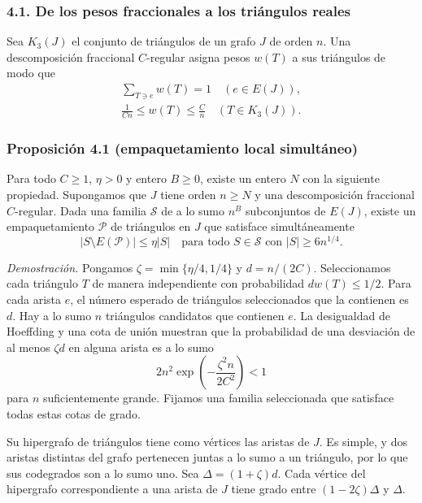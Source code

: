 \documentclass[spanish,11pt,a4paper]{article}
\providecommand{\mathscr}{\mathcal}
\begin{document}
\subsubsection{4.1. De los pesos fraccionales a los triángulos reales}\label{de-los-pesos-fraccionales-a-los-triuxe1ngulos-reales}

Sea \(K_3(J)\) el conjunto de triángulos de un grafo \(J\) de orden \(n\). Una descomposición fraccional \(C\)-regular asigna pesos \(w(T)\) a sus triángulos de modo que \[\begin{gathered}
\sum_{T\ni e}w(T)=1\quad(e\in E(J)),\\
\frac1{Cn}\le w(T)\le\frac Cn\quad(T\in K_3(J)).
\end{gathered}
\tag{4.1}\]

\subsubsection{Proposición 4.1 (empaquetamiento local simultáneo)}\label{proposiciuxf3n-4.1-empaquetamiento-local-simultuxe1neo}

Para todo \(C\ge1\), \(\eta>0\) y entero \(B\ge0\), existe un entero \(N\) con la siguiente propiedad. Supongamos que \(J\) tiene orden \(n\ge N\) y una descomposición fraccional \(C\)-regular. Dada una familia \(\mathscr S\) de a lo sumo \(n^B\) subconjuntos de \(E(J)\), existe un empaquetamiento \(\mathcal P\) de triángulos en \(J\) que satisface simultáneamente \[|S\setminus E(\mathcal P)|\le\eta|S|
\quad\text{para todo }S\in\mathscr S\text{ con }|S|\ge6n^{1/4}.
\tag{4.2}\]

\emph{Demostración.} Pongamos \(\zeta=\min\{\eta/4,1/4\}\) y \(d=n/(2C)\). Seleccionamos cada triángulo \(T\) de manera independiente con probabilidad \(dw(T)\le1/2\). Para cada arista \(e\), el número esperado de triángulos seleccionados que la contienen es \(d\). Hay a lo sumo \(n\) triángulos candidatos que contienen \(e\). La desigualdad de Hoeffding y una cota de unión muestran que la probabilidad de una desviación de al menos \(\zeta d\) en alguna arista es a lo sumo \[2n^2\exp\left(-\frac{\zeta^2 n}{2C^2}\right)<1
\tag{4.3}\] para \(n\) suficientemente grande. Fijamos una familia seleccionada que satisface todas estas cotas de grado.

Su hipergrafo de triángulos tiene como vértices las aristas de \(J\). Es simple, y dos aristas distintas del grafo pertenecen juntas a lo sumo a un triángulo, por lo que sus codegrados son a lo sumo uno. Sea \(\Delta=(1+\zeta)d\). Cada vértice del hipergrafo correspondiente a una arista de \(J\) tiene grado entre \((1-2\zeta)\Delta\) y \(\Delta\).
\end{document}
